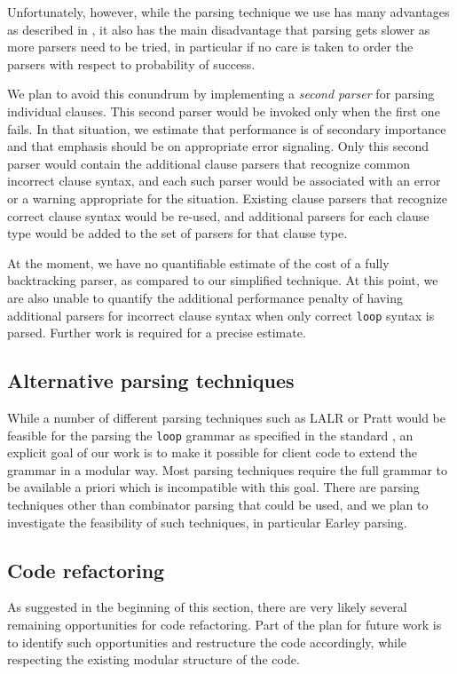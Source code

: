 Unfortunately, however, while the parsing technique we use has many
advantages as described in , it also has the main
disadvantage that parsing gets slower as more parsers need to be
tried, in particular if no care is taken to order the parsers with
respect to probability of success.

We plan to avoid this conundrum by implementing a \emph{second parser}
for parsing individual clauses.  This second parser would be invoked
only when the first one fails.  In that situation, we estimate that
performance is of secondary importance and that emphasis should be on
appropriate error signaling.  Only this second parser would contain
the additional clause parsers that recognize common incorrect clause
syntax, and each such parser would be associated with an error or a
warning appropriate for the situation.  Existing clause parsers that
recognize correct clause syntax would be re-used, and additional
parsers for each clause type would be added to the set of parsers for
that clause type.

At the moment, we have no quantifiable estimate of the cost of a fully
backtracking parser, as compared to our simplified technique.  At this
point, we are also unable to quantify the additional performance
penalty of having additional parsers for incorrect clause syntax when
only correct \texttt{loop} syntax is parsed.  Further work is required
for a precise estimate.

\subsection{Alternative parsing techniques}

While a number of different parsing techniques such as LALR
\cite{DeRemer:lalr} or Pratt \cite{Pratt:1973:TDO:512927.512931} would
be feasible for the parsing the \texttt{loop} grammar as specified in
the standard , an explicit goal of our work is to
make it possible for client code to extend the grammar in a modular
way.  Most parsing techniques require the full grammar to be available
a priori which is incompatible with this goal.  There are parsing
techniques other than combinator parsing that could be used, and we
plan to investigate the feasibility of such techniques, in particular
Earley \cite{Earley:1970:ECP:362007.362035} parsing.

\subsection{Code refactoring}

As suggested in the beginning of this section, there are very likely
several remaining opportunities for code refactoring.  Part of the
plan for future work is to identify such opportunities and restructure
the code accordingly, while respecting the existing modular structure
of the code.
